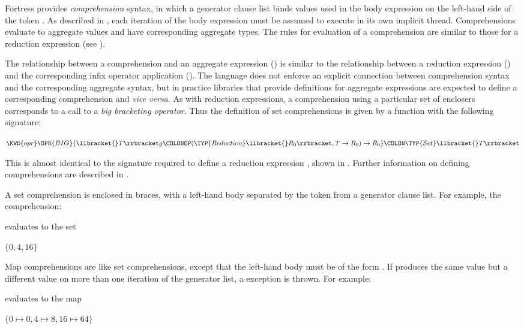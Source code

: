 Fortress provides \emph{comprehension} syntax, in which a generator clause list
binds values used in the body expression on the left-hand side of the
token \EXP{|}.  As described in , each iteration of
the body expression must be assumed to execute in its own implicit
thread.  Comprehensions evaluate to aggregate values and have
corresponding aggregate types.  The rules for evaluation of a
comprehension are similar to those for a reduction expression (see
).

The relationship between a comprehension and an aggregate expression () is similar to the relationship between a reduction expression () and the corresponding infix operator application ().  The language does not enforce an explicit connection between comprehension syntax and the corresponding aggregate syntax, but in practice libraries that provide definitions for aggregate expressions are expected to define a corresponding comprehension and \emph{vice versa}.  As with reduction expressions, a comprehension using a particular set of enclosers corresponds to a call to a \emph{big bracketing operator}.  Thus the definition of set comprehensions is given by a function with the following signature:
\begin{Fortress}
\(\KWD{opr} \mathord{\OPR{BIG}} \{\llbracket{}T\rrbracket g\COLONOP(\TYP{Reduction}\llbracket{}R_{0}\rrbracket,T\rightarrow{}R_{0})\rightarrow{}R_{0}\}\COLON \TYP{Set}\llbracket{}T\rrbracket\)
\end{Fortress}
This is almost identical to the signature required to define a reduction
expression , shown in .
Further information on defining comprehensions are described
in .

A set comprehension is enclosed in braces, with a left-hand body
separated by the token \EXP{|} from a generator clause list.
For example, the comprehension:

evaluates to the set
\begin{Fortress}
\(\{0, 4, 16\}\)
\end{Fortress}

Map comprehensions are like set comprehensions,
except that the left-hand body must be of the form
.
If  produces the same value but  a different value on more
than one iteration of the generator list,
a  exception is thrown.
For example:

evaluates to the map
\begin{Fortress}
\(\{0 \mapsto 0, 4 \mapsto 8, 16 \mapsto 64\}\)
\end{Fortress}



